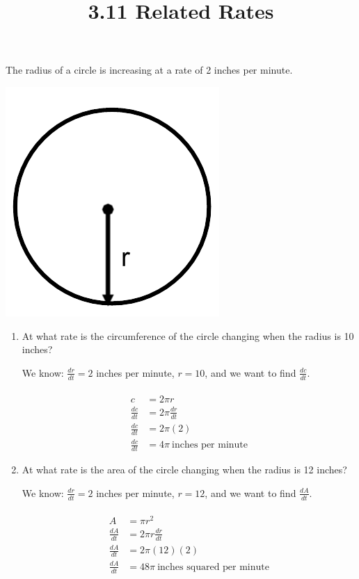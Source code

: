 \documentclass[nooutcomes]{ximera}
\title{3.11 Related Rates}
\begin{document}
\begin{abstract}		\end{abstract}
\maketitle


\begin{problem}
The radius of a circle is increasing at a rate of 2 inches per minute. 
	\begin{image}
	\includegraphics[scale=.5]{Figure2.png}
	\end{image}

\begin{enumerate}
	\item At what rate is the circumference of the circle changing when the radius is 10 inches?
	\begin{freeResponse}
	We know: ${\frac{dr}{dt}}=2$ inches per minute, $r=10$, and we want to find ${\frac{dc}{dt}}$.\\\\
	\begin{align*}
	c&=2\pi r\\
	{\frac{dc}{dt}}&=2\pi {\frac{dr}{dt}}\\
	{\frac{dc}{dt}}&=2 \pi (2)\\
	{\frac{dc}{dt}}&=4 \pi\ \text{inches per minute}
	\end{align*}
	\end{freeResponse}
	\item At what rate is the area of the circle changing when the radius is 12 inches?
		\begin{freeResponse}
	We know: ${\frac{dr}{dt}}=2$ inches per minute, $r=12$, and we want to find ${\frac{dA}{dt}}$.\\\\
	\begin{align*}
	A&=\pi r^2\\
	{\frac{dA}{dt}}&=2\pi r{\frac{dr}{dt}}\\
	{\frac{dA}{dt}}&=2 \pi (12)(2)\\
	{\frac{dA}{dt}}&=48 \pi\ \text{inches squared per minute}
	\end{align*}
	\end{freeResponse}
\end{enumerate}

\end{problem}
\end{document}
